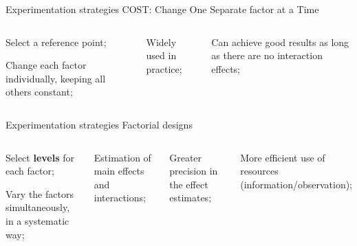 \documentclass[t]{beamer}
\begin{document}

\begin{ftst}
{Experimentation strategies}
{COST: Change One Separate factor at a Time}
\begin{columns}[T]
	\begin{block}{}
		\bitems Select a reference point;
			\item Change each factor individually, keeping all others constant;
		\eitem
	\end{block}
	\vone
	\bitems Widely used in practice;
		\item Can achieve good results as long as there are no interaction effects;
	\eitem
\end{columns}
\end{ftst}


\begin{ftst}
{Experimentation strategies}
{Factorial designs}
\begin{columns}[T]
	\begin{block}{}
		\bitems Select \textbf{levels} for each factor;
			\item Vary the factors simultaneously, in a systematic way;
		\eitem
	\end{block}
	\bitems Estimation of main effects and interactions;
		\item Greater precision in the effect estimates;
		\item More efficient use of resources (information/observation);
	\eitem
\end{columns}
\end{ftst}
\end{document}
